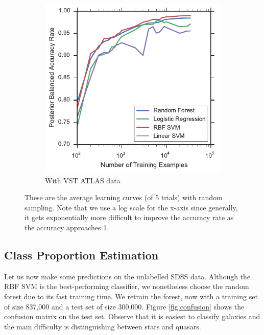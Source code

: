 \begin{figure}[tbp]
\begin{subfigure}{.5\textwidth}
		\includegraphics[width=0.99\linewidth]{figures/4_expt1/vstatlas_learning_curves}
		\caption{With VST ATLAS data}
		\label{fig:vstatlas_learning_curves}
	\end{subfigure}
	\caption[Learning curves with random sampling]{
		These are the average learning curves (of 5 trials) with random sampling.
		Note that we use a log scale for the x-axis since generally, it gets exponentially
		more difficult to improve the accuracy rate as the accuracy approaches 1.}
	\label{fig:learning_curves}
\end{figure}



\subsection{Class Proportion Estimation}
\label{sub:prop}

Let us now make some predictions on the unlabelled SDSS data. Although the RBF SVM is
the best-performing classifier, we nonetheless choose the random forest due to its fast
training time. We retrain the forest, now with a training set of size 837,000 and a test
set of size 300,000. Figure \ref{fig:confusion} shows the confusion matrix on the test set.
Observe that it is easiest to classify galaxies and the main difficulty is distinguishing
between stars and quasars.


